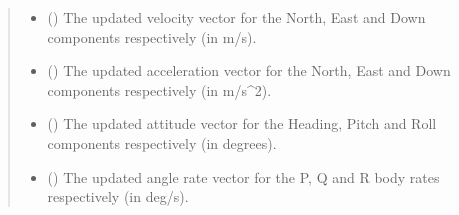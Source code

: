 \documentclass[letterpaper,10pt,english]{sphinxmanual}
\begin{document}
\begin{fulllineitems}
\begin{fulllineitems}
\begin{quote}
\begin{description}
\begin{itemize}
\item {} 
\sphinxAtStartPar
{} (\sphinxstyleliteralemphasis{\sphinxupquote{ (}}\sphinxstyleliteralemphasis{\sphinxupquote{)}}) \textendash{} The updated velocity vector for the
North, East and Down components respectively (in m/s).

\item {} 
\sphinxAtStartPar
{} (\sphinxstyleliteralemphasis{\sphinxupquote{ (}}\sphinxstyleliteralemphasis{\sphinxupquote{)}}) \textendash{} The updated acceleration vector for
the North, East and Down components respectively (in m/s\textasciicircum{}2).

\item {} 
\sphinxAtStartPar
{} (\sphinxstyleliteralemphasis{\sphinxupquote{ (}}\sphinxstyleliteralemphasis{\sphinxupquote{)}}) \textendash{} The updated attitude vector for the Heading,
Pitch and Roll components respectively (in degrees).

\item {} 
\sphinxAtStartPar
{} (\sphinxstyleliteralemphasis{\sphinxupquote{ (}}\sphinxstyleliteralemphasis{\sphinxupquote{)}}) \textendash{} The updated angle rate vector for the
P, Q and R body rates respectively (in deg/s).

\end{itemize}

\end{description}\end{quote}

\end{fulllineitems}



\end{fulllineitems}
\end{document}
